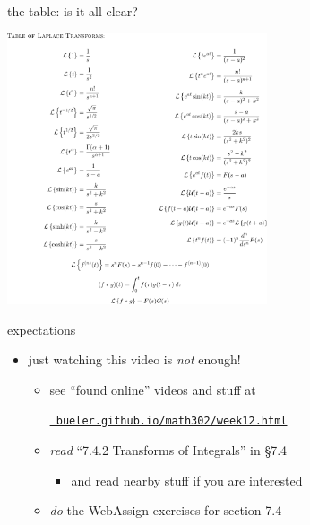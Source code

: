 \documentclass[urlcolor=blue,dvipsnames]{beamer}
\begin{document}
\begin{frame}{the table: is it all clear?}

\vspace{-3mm}
\begin{center}
\includegraphics[height=80mm]{figs/fulllaplacetable}
\end{center}
\end{frame}


\begin{frame}{expectations}

\begin{itemize}
\item just watching this video is \emph{not} enough!
     \begin{itemize}
     \item see ``found online'' videos and stuff at

     \centerline{\href{https://bueler.github.io/math302/week12.html}{\tt \color{cyan} bueler.github.io/math302/week12.html}}
     \item \emph{read} ``7.4.2 Transforms of Integrals'' in \S7.4
         \begin{itemize}
         \item and read nearby stuff if you are interested
         \end{itemize}
     \item \emph{do} the WebAssign exercises for section 7.4
     \end{itemize}
\end{itemize}
\end{frame}
\end{document}

